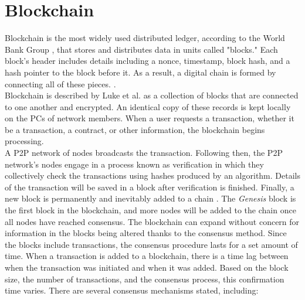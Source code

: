 \section{Blockchain}Blockchain is the most widely used distributed ledger, according to the World Bank Group \cite{Natarajan}, that stores and distributes data in units called "blocks." Each block's header includes details including a nonce, timestamp, block hash, and a hash pointer to the block before it. As a result, a digital chain is formed by connecting all of these pieces. \cite{Natarajan}. \\
Blockchain is described by Luke et al. \cite{Luke} as a collection of blocks that are connected to one another and encrypted. An identical copy of these records is kept locally on the PCs of network members. When a user requests a transaction, whether it be a transaction, a contract, or other information, the blockchain begins processing. \\
A P2P network of nodes broadcasts the transaction. Following then, the P2P network's nodes engage in a process known as verification in which they collectively check the transactions using hashes produced by an algorithm. Details of the transaction will be saved in a block after verification is finished. Finally, a new block is permanently and inevitably added to a chain \cite{Luke}.
The \textit{Genesis} block is the first block in the blockchain, and more nodes will be added to the chain once all nodes have reached consensus. The blockchain can expand without concern for information in the blocks being altered thanks to the consensus method. Since the blocks include transactions, the consensus procedure lasts for a set amount of time. When a transaction is added to a blockchain, there is a time lag between when the transaction was initiated and when it was added. Based on the block size, the number of transactions, and the consensus process, this confirmation time varies. There are several consensus mechanisms stated, including:

